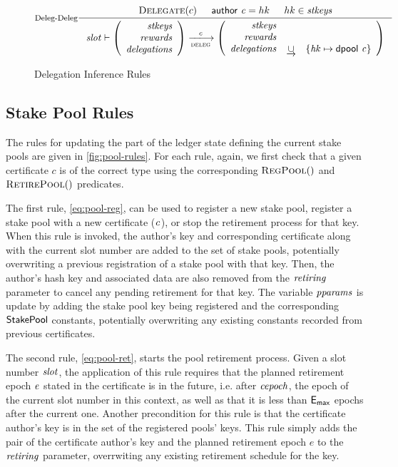 \begin{figure}
  \begin{equation}\label{eq:deleg-deleg}
    \inference[Deleg-Deleg]
    {
      \Delegate{c} & \cauthor{c} = hk & hk \in \var{stkeys}
    }
    {
      \var{slot} \vdash
      \left(
      \begin{array}{r}
        \var{stkeys} \\
        \var{rewards} \\
        \var{delegations}
      \end{array}
      \right)
      \trans{deleg}{c}
      \left(
      \begin{array}{rcl}
        \var{stkeys} \\
        \var{rewards} \\
        \var{delegations} & \unionoverrideRight & \{\var{hk} \mapsto \dpool c\}
      \end{array}
      \right)
    }
  \end{equation}
  \caption{Delegation Inference Rules}
  \label{fig:delegation-rules}
\end{figure}



\subsection{Stake Pool Rules}
\label{sec:pool-rules}


The rules for updating the part of the ledger state defining the current stake
pools are given in \cref{fig:pool-rules}.
For each rule, again, we first check that a given certificate $c$ is of
the correct type using the
corresponding $\RegPool$ and $\RetirePool$ predicates.

The first rule, \cref{eq:pool-reg}, can be used to register a new stake pool, register a
stake pool with a new certificate ($\mathit{c}$), or stop the retirement
process for that key.  When this rule is invoked,
 the author's key and corresponding certificate along with the current slot
 number are added to the set of stake pools,
potentially overwriting a previous registration of a stake pool with
 that key. Then, the author's hash key and associated data
are also removed from the $\mathit{retiring}$ parameter to cancel any pending
retirement for that key. The variable $\mathit{pparams}$ is update by adding
the stake pool key being registered and the corresponding $\mathsf{StakePool}$
constants, potentially overwriting any existing constants recorded from
previous certificates.

The second rule, \cref{eq:pool-ret}, starts the pool retirement process. Given a
slot number $\mathit{slot}$, the application of this rule requires that the
planned retirement epoch $\mathit{e}$ stated in the certificate is in the future,
i.e. after
$\mathit{cepoch}$, the epoch of the current slot number in this context, as well as
that it is
less than $\mathsf{E_{max}}$ epochs after the current one. Another precondition for this
rule is that
the certificate author's key is in the set of the registered pools' keys.
This rule simply adds the pair of the
certificate author's key and the planned retirement epoch $e$ to the $\mathit{retiring}$
parameter, overrwiting any existing retirement schedule for the key.

